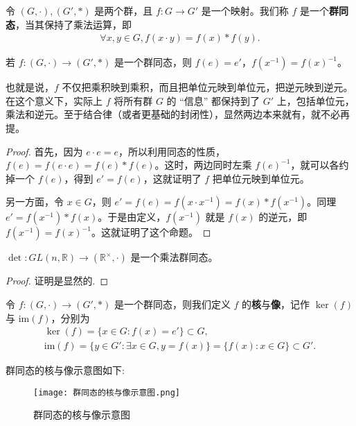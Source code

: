 \documentclass[../../main.tex]{subfiles}
\begin{document}
\begin{definition}[群同态]
令 $(G, \cdot), (G', *)$ 是两个群，且 $f : G \to G'$ 是一个映射。我们称 $f$ 是一个\textbf{群同态}，当其保持了乘法运算，即
\begin{align*}
\forall x, y \in G, f(x \cdot y) = f(x) * f(y).
\end{align*} 
\end{definition}

\begin{proposition}
若 $f : (G, \cdot) \to (G', *)$ 是一个群同态，则 $f(e) = e'$，$f(x^{-1}) = f(x)^{-1}$。
\end{proposition}
\begin{note}
也就是说，$f$ 不仅把乘积映到乘积，而且把单位元映到单位元，把逆元映到逆元。在这个意义下，实际上 $f$ 将所有群 $G$ 的 “信息” 都保持到了 $G'$ 上，包括单位元，乘法和逆元。至于结合律（或者更基础的封闭性），显然两边本来就有，就不必再提。
\end{note}
\begin{proof}
首先，因为 $e \cdot e = e$，所以利用同态的性质，$f(e) = f(e \cdot e) = f(e) * f(e)$。这时，两边同时左乘 $f(e)^{-1}$，就可以各约掉一个 $f(e)$，得到 $e' = f(e)$，这就证明了 $f$ 把单位元映到单位元。

另一方面，令 $x \in G$，则 $e' = f(e) = f(x \cdot x^{-1}) = f(x) * f(x^{-1})$。同理 $e' = f(x^{-1}) * f(x)$。于是由定义，$f(x^{-1})$ 就是 $f(x)$ 的逆元，即 $f(x^{-1}) = f(x)^{-1}$。这就证明了这个命题。 
\end{proof}

\begin{proposition}\label{proposition:行列是就是一个乘法群同态}
$\det : GL(n, \mathbb{R}) \to (\mathbb{R}^\times, \cdot)$ 是一个乘法群同态。 
\end{proposition}
\begin{proof}
证明是显然的.
\end{proof}

\begin{definition}[群同态的核与像]
令 $f : (G, \cdot) \to (G', *)$ 是一个群同态，则我们定义 $f$ 的\textbf{核}与\textbf{像}，记作 $\ker(f)$ 与 $\mathrm{im}(f)$，分别为
\begin{gather*}
\ker(f) = \{x \in G : f(x) = e'\} \subset G ,\\
\mathrm{im}(f) = \{y \in G' : \exists x \in G, y = f(x)\} = \{f(x) : x \in G\} \subset G'.
\end{gather*} 
\end{definition}
\begin{note}
群同态的核与像示意图如下:
\begin{figure}[H]
\centering
\texttt{[image: 群同态的核与像示意图.png]}
\label{figure:群同态的核与像示意图}
\caption{群同态的核与像示意图}
\end{figure}
\end{note}
\end{document}
